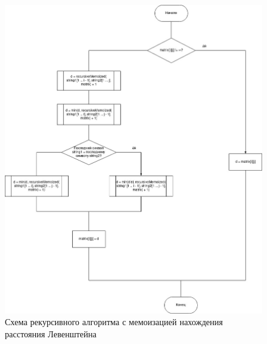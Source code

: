 \documentclass[12pt]{report}
\begin{document}
\begin{figure}[h]
	\centering
	\includegraphics[scale=0.45]{mem.jpg}
	\caption{Схема рекурсивного алгоритма с мемоизацией нахождения расстояния Левенштейна}
	\label{fig:mpr}
\end{figure}
\end{document}
